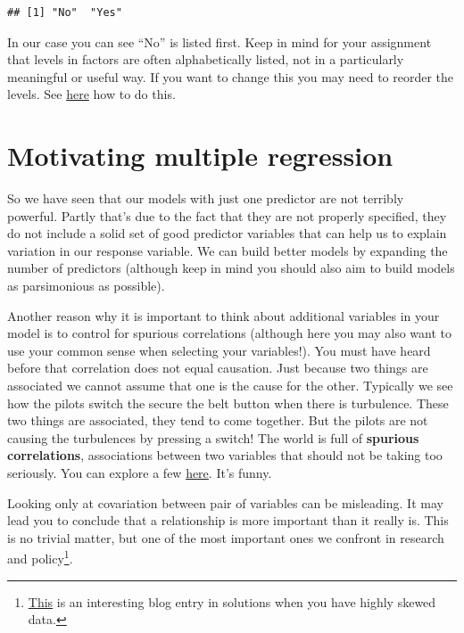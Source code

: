 \documentclass[
]{book}
\begin{document}
\begin{verbatim}
## [1] "No"  "Yes"
\end{verbatim}

In our case you can see ``No'' is listed first. Keep in mind for your assignment that levels in factors are often alphabetically listed, not in a particularly meaningful or useful way.
If you want to change this you may need to reorder the levels. See \href{https://forcats.tidyverse.org/reference/fct_relevel.html}{here} how to do this.

\hypertarget{motivating-multiple-regression}{%
\section{Motivating multiple regression}\label{motivating-multiple-regression}}

So we have seen that our models with just one predictor are not terribly powerful. Partly that's due to the fact that they are not properly specified, they do not include a solid set of good predictor variables that can help us to explain variation in our response variable. We can build better models by expanding the number of predictors (although keep in mind you should also aim to build models as parsimonious as possible).

Another reason why it is important to think about additional variables in your model is to control for spurious correlations (although here you may also want to use your common sense when selecting your variables!). You must have heard before that correlation does not equal causation. Just because two things are associated we cannot assume that one is the cause for the other. Typically we see how the pilots switch the secure the belt button when there is turbulence. These two things are associated, they tend to come together. But the pilots are not causing the turbulences by pressing a switch! The world is full of \textbf{spurious correlations}, associations between two variables that should not be taking too seriously. You can explore a few \href{http://tylervigen.com/}{here}. It's funny.

Looking only at covariation between pair of variables can be misleading. It may lead you to conclude that a relationship is more important than it really is. This is no trivial matter, but one of the most important ones we confront in research and policy\footnote{\href{http://tomhopper.me/2010/08/30/graphing-highly-skewed-data/}{This} is an interesting blog entry in solutions when you have highly skewed data.}.
\end{document}
